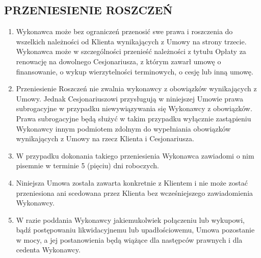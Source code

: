 \begin{multicols}{2}
\subsection{PRZENIESIENIE ROSZCZEŃ}
\begin{enumerate}
	\item Wykonawca może bez ograniczeń przenosić swe prawa i roszczenia do wszelkich należności od Klienta wynikających z Umowy na strony trzecie. Wykonawca może w szczególności przenieść należności z tytułu Opłaty za renowację na dowolnego Cesjonariusza, z którym zawarł umowę o finansowanie, o wykup wierzytelności terminowych, o cesję lub inną umowę.
	\item Przeniesienie Roszczeń nie zwalnia wykonawcy z obowiązków wynikających z Umowy. Jednak Cesjonariuszowi przysługują w niniejszej Umowie prawa subrogacyjne w przypadku niewywiązywania się Wykonawcy z obowiązków. Prawa subrogacyjne będą służyć w takim przypadku wyłącznie zastąpieniu Wykonawcy innym podmiotem zdolnym do wypełniania obowiązków wynikających z Umowy na rzecz Klienta i Cesjonariusza.
	\item W przypadku dokonania takiego przeniesienia Wykonawca zawiadomi o nim pisemnie w terminie 5 (pięciu) dni roboczych.
	\item Niniejsza Umowa została zawarta konkretnie z Klientem i nie może zostać przeniesiona ani scedowana przez Klienta bez wcześniejszego zawiadomienia Wykonawcy.
	\item W razie poddania Wykonawcy jakiemukolwiek połączeniu lub wykupowi, bądź postępowaniu likwidacyjnemu lub upadłościowemu, Umowa pozostanie w mocy, a jej postanowienia będą wiążące dla następców prawnych i dla cedenta Wykonawcy.
\end{enumerate}


\end{multicols}
